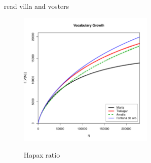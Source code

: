 \documentclass[12pt]{report}
\newenvironment{knitrout}{}{} %
\begin{document}
read villa and vosters




\begin{figure}
	\caption{}
\end{figure}


\begin{figure}
	\caption{}
\begin{knitrout}
\color{fgcolor}
\includegraphics[width=250,height=250]{figure/Vgc-1} 

\end{knitrout}
\end{figure}


\begin{figure}
	\caption{Hapax ratio}

\end{figure}
\end{document}
